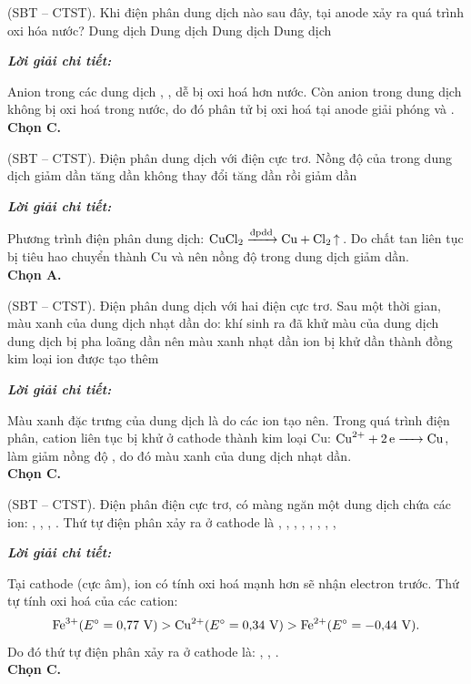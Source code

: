 \documentclass[11pt,a4paper]{article}
\def\loigiai#1{
\par\begingroup\color{blue!80!black}\small
\noindent\textbf{\textit{Lời giải chi tiết:}}\par
#1\par\endgroup}
\begin{document}
\begin{ex}
(SBT – CTST). Khi điện phân dung dịch nào sau đây, tại anode xảy ra quá trình oxi hóa nước?
\choice
{Dung dịch }
{Dung dịch }
{\True Dung dịch }
{Dung dịch }
\loigiai{
Anion  trong các dung dịch , \ce{CuCl2}, \ce{MgCl2} dễ bị oxi hoá hơn nước. Còn anion \ce{NO3-} trong dung dịch \ce{AgNO3} không bị oxi hoá trong nước, do đó phân tử \ce{H2O} bị oxi hoá tại anode giải phóng \ce{O2} và \ce{H+}.\\
\textbf{Chọn C.}}
\end{ex}

\begin{ex}
(SBT – CTST). Điện phân dung dịch  với điện cực trơ. Nồng độ của  trong dung dịch
\choice
{\True giảm dần}
{tăng dần}
{không thay đổi}
{tăng dần rồi giảm dần}
\loigiai{
Phương trình điện phân dung dịch: $\ce{CuCl2 ->[\text{đpdd}] Cu + Cl2 ^}$. Do chất tan \ce{CuCl2} liên tục bị tiêu hao chuyển thành Cu và \ce{Cl2} nên nồng độ \ce{CuCl2} trong dung dịch giảm dần.\\
\textbf{Chọn A.}}
\end{ex}

\begin{ex}
(SBT – CTST). Điện phân dung dịch  với hai điện cực trơ. Sau một thời gian, màu xanh của dung dịch nhạt dần do:
\choice
{khí  sinh ra đã khử màu của dung dịch}
{dung dịch bị pha loãng dần nên màu xanh nhạt dần}
{\True ion  bị khử dần thành đồng kim loại}
{ion  được tạo thêm}
\loigiai{
Màu xanh đặc trưng của dung dịch là do các ion \ce{Cu^2+} tạo nên. Trong quá trình điện phân, cation \ce{Cu^2+} liên tục bị khử ở cathode thành kim loại Cu: $\ce{Cu^2+ + 2e -> Cu}$, làm giảm nồng độ \ce{Cu^2+}, do đó màu xanh của dung dịch nhạt dần.\\
\textbf{Chọn C.}}
\end{ex}

\begin{ex}
(SBT – CTST). Điện phân điện cực trơ, có màng ngăn một dung dịch chứa các ion: , , , . Thứ tự điện phân xảy ra ở cathode là
\choice
{, , }
{, , }
{\True {}, , }
{, , }
\loigiai{
Tại cathode (cực âm), ion có tính oxi hoá mạnh hơn sẽ nhận electron trước. Thứ tự tính oxi hoá của các cation:\\
$$\ce{Fe^3+} (E^\circ = 0{,}77\text{ V}) > \ce{Cu^2+} (E^\circ = 0{,}34\text{ V}) > \ce{Fe^2+} (E^\circ = -0{,}44\text{ V}).$$
Do đó thứ tự điện phân xảy ra ở cathode là: \ce{Fe^3+}, \ce{Cu^2+}, \ce{Fe^2+}.\\
\textbf{Chọn C.}}
\end{ex}
\end{document}
